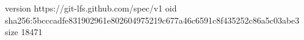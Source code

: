 version https://git-lfs.github.com/spec/v1
oid sha256:5bcccadfe831902961e802604975219c677a46c6591c8f435252c86a5c03abe3
size 18471
